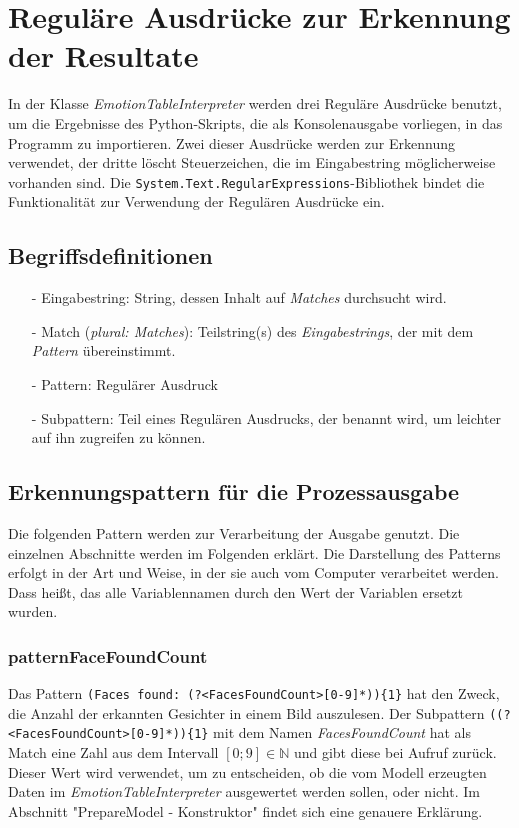 \documentclass[10pt,a4paper]{report}
\begin{document}
\section{Reguläre Ausdrücke zur Erkennung der Resultate}
In der Klasse \textit{EmotionTableInterpreter} werden drei Reguläre Ausdrücke benutzt, um die Ergebnisse des Python-Skripts, die als Konsolenausgabe vorliegen, in das Programm zu importieren. Zwei dieser Ausdrücke werden zur Erkennung verwendet, der dritte löscht Steuerzeichen, die im Eingabestring möglicherweise vorhanden sind. Die \texttt{System.Text.RegularExpressions}-Bibliothek bindet die Funktionalität zur Verwendung der Regulären Ausdrücke ein.
\subsection{Begriffsdefinitionen}
\begin{itemize}
\item[-] Eingabestring: String, dessen Inhalt auf \textit{Matches} durchsucht wird.
\item[-] Match (\textit{plural: Matches}): Teilstring(s) des \textit{Eingabestrings}, der mit dem \textit{Pattern} übereinstimmt.
\item[-] Pattern: Regulärer Ausdruck
\item[-] Subpattern: Teil eines Regulären Ausdrucks, der benannt wird, um leichter auf ihn zugreifen zu können.
\end{itemize}
\subsection{Erkennungspattern für die Prozessausgabe}
Die folgenden Pattern werden zur Verarbeitung der Ausgabe genutzt. Die einzelnen Abschnitte werden im Folgenden erklärt. Die Darstellung des Patterns erfolgt in der Art und Weise, in der sie auch vom Computer verarbeitet werden. Dass heißt, das alle Variablennamen durch den Wert der Variablen ersetzt wurden.
\subsubsection{patternFaceFoundCount}
Das Pattern \texttt{(Faces found:  (?<FacesFoundCount>[0-9]*))\{1\}} hat den Zweck, die Anzahl der erkannten Gesichter in einem Bild auszulesen. Der Subpattern \texttt{((?<FacesFoundCount>[0-9]*))\{1\}} mit dem Namen \textit{FacesFoundCount} hat als Match eine Zahl aus dem Intervall $\left[0;9\right] \in \mathbb{N}$ und gibt diese bei Aufruf zurück. Dieser Wert wird verwendet, um zu entscheiden, ob die vom Modell erzeugten Daten im \textit{EmotionTableInterpreter} ausgewertet werden sollen, oder nicht. Im Abschnitt "PrepareModel - Konstruktor" findet sich eine genauere Erklärung.
\end{document}
